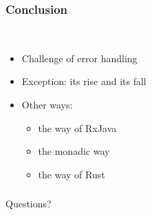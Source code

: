 \documentclass[lualatex]{beamer}
\begin{document}
\begin{frame}
  \frametitle{Conclusion}
  \begin{block}{~}
    \begin{itemize}
    \item Challenge of error handling
    \item Exception: its rise and its fall
    \item Other ways:
      \begin{itemize}
      \item the way of RxJava
      \item the monadic way
      \item the way of Rust
      \end{itemize}
    \end{itemize}
  \end{block}
\end{frame}

\begin{frame}
  \frametitle{}
  \begin{center}
    \Huge
    Questions?
  \end{center}
\end{frame}
\end{document}
